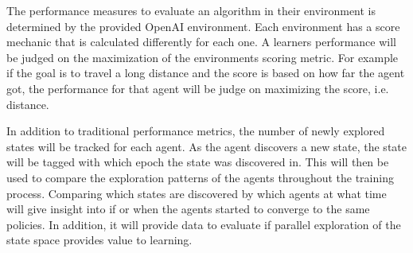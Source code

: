 \documentclass[jair,twoside,11pt,theapa]{article}
\begin{document}
The performance measures to evaluate an algorithm in their environment is determined by the provided OpenAI environment. Each environment has a score mechanic that is calculated
differently for each one. A learners performance will be judged on the maximization of the environments scoring metric. For example if the goal is to travel a long distance and the score 
is based on how far the agent got, the performance for that agent will be judge on maximizing the score, i.e. distance. 

In addition to traditional performance metrics, the number of newly explored states will be tracked for each agent. As the agent discovers a new state, the state will be tagged with which epoch
the state was discovered in. This will then be used to compare the exploration patterns of the agents throughout the training process. Comparing which states are discovered by which agents at what time
will give insight into if or when the agents started to converge to the same policies. In addition, it will provide data to evaluate if parallel exploration of the state space provides value to learning. 



\vskip 0.2in


\end{document}
